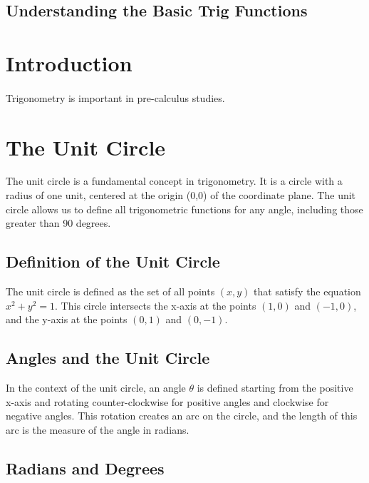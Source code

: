 \documentclass[a4paper,12pt]{book}
\begin{document}
\subsection*{Understanding the Basic Trig Functions}

\section*{Introduction}
\paragraph{}
Trigonometry is important in pre-calculus studies.

\section{The Unit Circle}
\label{sec:unit_circle}

The unit circle is a fundamental concept in trigonometry. It is a circle with a radius of one unit, centered at the origin (0,0) of the coordinate plane. The unit circle allows us to define all trigonometric functions for any angle, including those greater than 90 degrees.

\subsection{Definition of the Unit Circle}
\label{subsec:unit_circle_definition}

The unit circle is defined as the set of all points \((x, y)\) that satisfy the equation \(x^2 + y^2 = 1\). This circle intersects the x-axis at the points \((1, 0)\) and \((-1, 0)\), and the y-axis at the points \((0, 1)\) and \((0, -1)\).

\subsection{Angles and the Unit Circle}
\label{subsec:angles_unit_circle}

In the context of the unit circle, an angle \(\theta\) is defined starting from the positive x-axis and rotating counter-clockwise for positive angles and clockwise for negative angles. This rotation creates an arc on the circle, and the length of this arc is the measure of the angle in radians.

\subsection{Radians and Degrees}
\label{subsec:radians_degrees}
\end{document}
